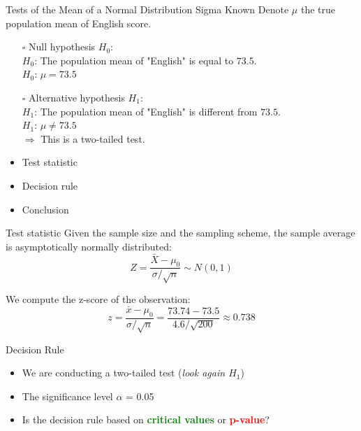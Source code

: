 \documentclass[
  10pt,
  ignorenonframetext,
]{beamer}
\begin{document}
\begin{frame}{Tests of the Mean of a Normal Distribution Sigma Known}
\protect\hypertarget{tests-of-the-mean-of-a-normal-distribution-sigma-known-2}{}
Denote \(\mu\) the true population mean of English score.

\begin{itemize}
    \item [$\square$] Null hypothesis $H_0$:\\
      $H_0$: The population mean of "English" is equal to $73.5$.\\  
      $H_0$: $\mu = 73.5$
    \vspace{2mm}
    \item [$\square$] Alternative hypothesis $H_1$:\\
      $H_1$: The population mean of "English" is different from $73.5$.\\  
      $H_1$: $\mu \neq 73.5$\\
      $\Rightarrow$ This is a two-tailed test.
    \vspace{2mm}
    \item Test statistic
    \item Decision rule
    \item Conclusion
\end{itemize}
\end{frame}

\begin{frame}{Test statistic}
\protect\hypertarget{test-statistic}{}
Given the sample size and the sampling scheme, the sample average is
asymptotically normally distributed: \[
Z =\frac{\bar{X}-\mu_0}{\sigma/\sqrt{n}} \sim N(0,1)
\]

We compute the z-score of the observation: \[
z = \frac{\bar{x}-\mu_0}{\sigma/\sqrt{n}} = \frac{73.74-73.5}{4.6/\sqrt{200}} \approx 0.738
\]
\end{frame}

\begin{frame}{Decision Rule}
\protect\hypertarget{decision-rule}{}
\begin{itemize}
    \item We are conducting a two-tailed test (\textit{look again $H_1$})\\
    \item The significance level $\alpha$ = 0.05\\
    \item Is the decision rule based on \textcolor{green}{\textbf{critical values}} or \textcolor{red}{\textbf{p-value}}?\\
\end{itemize}
\end{frame}
\end{document}
